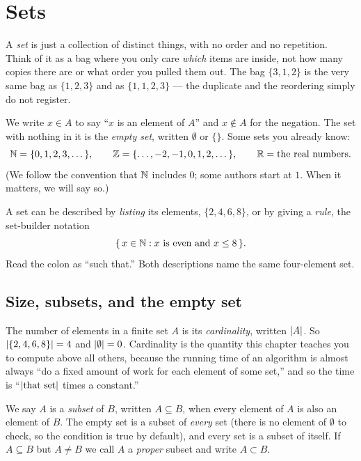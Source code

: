 \section{Sets}
\label{ch38:sets}

\begin{intuitionbox}
A \emph{set} is just a collection of distinct things, with no order and no
repetition. Think of it as a bag where you only care \emph{which} items are inside,
not how many copies there are or what order you pulled them out. The bag
$\{3, 1, 2\}$ is the very same bag as $\{1, 2, 3\}$ and as $\{1, 1, 2, 3\}$ --- the
duplicate and the reordering simply do not register.
\end{intuitionbox}

We write $x \in A$ to say ``$x$ is an element of $A$'' and $x \notin A$ for the
negation. The set with nothing in it is the \emph{empty set}, written $\emptyset$ or
$\{\}$. Some sets you already know:
\[
\mathbb{N} = \{0, 1, 2, 3, \dots\}, \qquad
\mathbb{Z} = \{\dots, -2, -1, 0, 1, 2, \dots\}, \qquad
\mathbb{R} = \text{the real numbers.}
\]
(We follow the convention that $\mathbb{N}$ includes $0$; some authors start at $1$. When it
matters, we will say so.)

A set can be described by \emph{listing} its elements, $\{2, 4, 6, 8\}$, or by giving
a \emph{rule}, the set-builder notation
\[
\{\, x \in \mathbb{N} : x \text{ is even and } x \le 8 \,\}.
\]
Read the colon as ``such that.'' Both descriptions name the same four-element set.

\subsection{Size, subsets, and the empty set}

The number of elements in a finite set $A$ is its \emph{cardinality}, written
$\lvert A\rvert$. So $\lvert\{2,4,6,8\}\rvert = 4$ and $\lvert\emptyset\rvert = 0$. Cardinality is the
quantity this chapter teaches you to compute above all others, because the running
time of an algorithm is almost always ``do a fixed amount of work for each element of
some set,'' and so the time is ``$\lvert\text{that set}\rvert$ times a constant.''

We say $A$ is a \emph{subset} of $B$, written $A \subseteq B$, when every element of
$A$ is also an element of $B$. The empty set is a subset of \emph{every} set (there
is no element of $\emptyset$ to check, so the condition is true by default), and every
set is a subset of itself. If $A \subseteq B$ but $A \ne B$ we call $A$ a
\emph{proper} subset and write $A \subset B$.

